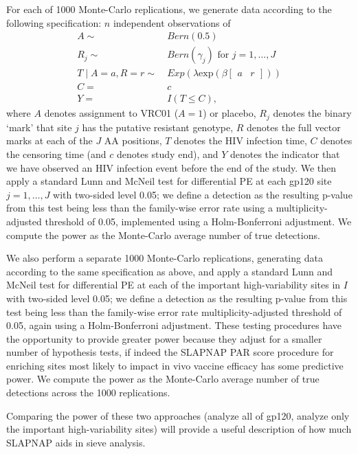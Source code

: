 \documentclass[10pt]{article}
\begin{document}
For each of 1000 Monte-Carlo replications, we generate data according to the following specification: $n$ independent observations of
\begin{align*}
  A \sim & \ Bern(0.5) \\
  R_j \sim & \ Bern(\gamma_j) \text{ for } j = 1, \ldots, J \\
  T \mid A = a, R = r \sim & \ Exp(\lambda\text{exp}(\beta \begin{bmatrix}a & r \end{bmatrix})) \\
  C =& \ c \\
  Y =& \ I(T \leq C),
\end{align*}
where $A$ denotes assignment to VRC01 ($A = 1$) or placebo, $R_j$ denotes the binary `mark' that site $j$ has the putative resistant genotype, $R$ denotes the full vector marks at each of the $J$ AA positions, $T$ denotes the HIV infection time, $C$ denotes the censoring time (and $c$ denotes study end), and $Y$ denotes the indicator that we have observed an HIV infection event before the end of the study.
We then apply a standard Lunn and McNeil test for differential PE at each gp120 site $j = 1, \ldots, J$ with two-sided level 0.05; we define a detection as the resulting p-value from this test being less than the family-wise error rate using a multiplicity-adjusted threshold of 0.05, implemented using a Holm-Bonferroni adjustment. We compute the power as the Monte-Carlo average number of true detections.

We also perform a separate 1000 Monte-Carlo replications, generating data according to the same specification as above, and apply a standard Lunn and McNeil test for differential PE at each of the important high-variability sites in $I$ with two-sided level 0.05; we define a detection as the resulting p-value from this test being less than the family-wise error rate multiplicity-adjusted threshold of 0.05, again using a Holm-Bonferroni adjustment. These testing procedures have the opportunity to provide greater power because they adjust for a smaller number of hypothesis tests, if indeed the SLAPNAP PAR score procedure for enriching sites most likely to impact in vivo vaccine efficacy has some predictive power. We compute the power as the Monte-Carlo average number of true detections across the 1000 replications.

Comparing the power of these two approaches (analyze all of gp120, analyze only the important high-variability sites) will provide a useful description of how much SLAPNAP aids in sieve analysis.

\end{document}

